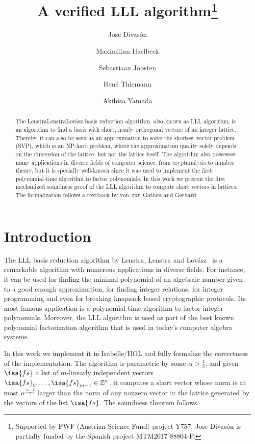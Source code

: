 \documentclass[11pt,a4paper]{article}
\newcommand\ints{\mathbb{Z}}
\newcommand\Base[2][m]{{#2}_0,\ldots,{#2}_{#1-1}}
\begin{document}
\title{A verified LLL algorithm\footnote{Supported by FWF (Austrian Science Fund) project Y757.
Jose Divas\'on is partially funded by the
Spanish project MTM2017-88804-P.}}
\author{Jose Divas\'on \and
  Maximilian Haslbeck \and
  Sebastiaan Joosten \and
  Ren\'e Thiemann \and
  Akihisa Yamada}
\maketitle


\begin{abstract}
The Lenstra\textendash{}Lenstra\textendash{}Lov\'asz basis reduction algorithm, 
also known as LLL algorithm, is an algorithm 
to find a basis with short, nearly orthogonal vectors of an integer lattice. 
Thereby, it can also be seen as an approximation to solve the shortest vector problem (SVP), 
which is an NP-hard problem, where the approximation
quality solely depends on the dimension of the lattice, but not the lattice itself. 
The algorithm also possesses many applications in diverse fields of computer science, 
from cryptanalysis to number theory, but it is specially well-known 
since it was used to implement the first polynomial-time algorithm to factor polynomials.
In this work we present the first mechanized soundness proof of the LLL algorithm to compute 
short vectors in lattices. The formalization follows a textbook by von~zur~Gathen and Gerhard~\cite{MCA}.
\end{abstract}

\tableofcontents

\section{Introduction}

The LLL basis reduction algorithm by Lenstra, Lenstra and Lov\'asz~\cite{LLL} is a remarkable algorithm with 
numerous applications in diverse fields. For instance, it can be used for 
finding the minimal polynomial of an algebraic number given to a good enough approximation, for finding integer
relations, for integer programming and even for breaking knapsack based cryptographic protocols.
Its most famous application is a polynomial-time algorithm to factor integer polynomials.
Moreover, the LLL algorithm is used as part of the best known polynomial factorization algorithm 
that is used in today's computer algebra systems.

In this work we implement it in Isabelle/HOL and fully formalize the correctness of the implementation.
The algorithm is parametric by some $\alpha > \frac43$, and given $\isa{fs}$ a list of 
$m$-linearly independent vectors $\Base {\isa{fs}} \in \ints^n$, it computes a short vector whose norm is at most $\alpha^{\frac{m-1}2}$ larger 
than the norm of any nonzero vector in the lattice generated by the vectors of the list $\isa{fs}$.
The soundness theorem follows.
\end{document}
